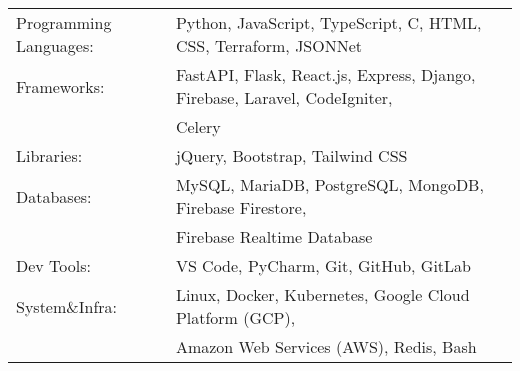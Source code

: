 \begin{tabular}{ l l }
	Programming Languages: & Python, JavaScript, TypeScript, C, HTML, CSS, Terraform, JSONNet                         \\
	Frameworks:            & FastAPI, Flask, React.js, Express, Django, Firebase, Laravel, CodeIgniter,  \\ & Celery        \\
	Libraries:             & jQuery, Bootstrap, Tailwind CSS                                                          \\
	Databases:             & MySQL, MariaDB, PostgreSQL, MongoDB, Firebase Firestore, \\ & Firebase Realtime Database      \\
	Dev Tools:             & VS Code, PyCharm, Git, GitHub, GitLab                                                    \\
	System\&Infra:         & Linux, Docker, Kubernetes, Google Cloud Platform (GCP), \\ & Amazon Web Services (AWS), Redis, Bash \\
\end{tabular}
\vspace{2mm}

